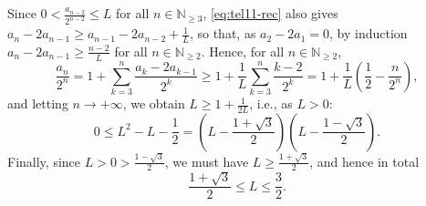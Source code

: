 \begin{solution}
    \\\\
    Since \( 0 < \frac{a_{n-2}}{2^{n-2}} \leq L \) for all \( n \in \mathbb{N}_{\geq 3} \), \eqref{eq:tel11-rec} also gives \( a_n-2a_{n-1} \geq a_{n-1}-2a_{n-2}+\frac{1}{L} \), so that, as \( a_2-2a_1 = 0 \), by induction \( a_n-2a_{n-1} \geq \frac{n-2}{L} \) for all \( n \in \mathbb{N}_{\geq 2} \). Hence, for all \( n \in \mathbb{N}_{\geq 2} \),
    \[
        \frac{a_n}{2^n} = 1+\sum_{k=3}^{n} \frac{a_k-2a_{k-1}}{2^k} \geq 1+\frac{1}{L}\sum_{k=3}^{n} \frac{k-2}{2^k} = 1+\frac{1}{L}\left(\frac{1}{2}-\frac{n}{2^n}\right),
    \]
    and letting \( n \to +\infty \), we obtain \( L \geq 1+\frac{1}{2L} \), i.e., as \( L > 0 \):
    \[
        0\leq L^2-L-\frac{1}{2} = \left(L-\frac{1+\sqrt{3}}{2}\right)\left(L-\frac{1-\sqrt{3}}{2}\right).
    \]
    Finally, since \( L > 0 > \frac{1-\sqrt{3}}{2} \), we must have \( L \geq \frac{1+\sqrt{3}}{2} \), and hence in total
    \[
        \frac{1+\sqrt{3}}{2} \leq L \leq \frac{3}{2}.
    \]
\end{solution}
